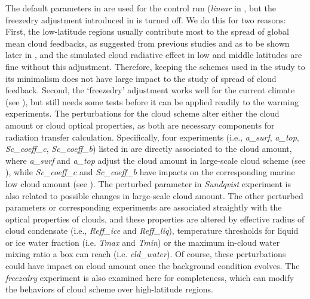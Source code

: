 The default parameters in  are used for the control run (\textit{linear} in , but the freezedry adjustment introduced in  is turned off. We do this for two reasons: First, the low-latitude regions usually contribute most to the spread of global mean cloud feedbacks, as suggested from previous studies and as to be shown later in , and the simulated cloud radiative effect in low and middle latitudes are fine without this adjustment. Therefore, keeping the schemes used in the study to its minimalism does not have large impact to the study of spread of cloud feedback. Second, the `freezedry' adjustment works well for the current climate (see ), but still needs some tests before it can be applied readily to the warming experiments. The perturbations for the cloud scheme alter either the cloud amount or cloud optical properties, as both are necessary components for radiation transfer calculation. Specifically, four experiments (i.e., \textit{a\_surf}, \textit{a\_top}, \textit{Sc\_coeff\_c}, \textit{Sc\_coeff\_b}) listed in  are directly associated to the cloud amount, where \textit{a\_surf} and \textit{a\_top} adjust the cloud amount in large-scale cloud scheme (see ), while \textit{Sc\_coeff\_c} and \textit{Sc\_coeff\_b} have impacts on the corresponding marine low cloud amount (see ). The perturbed parameter in \textit{Sundqvist} experiment is also related to possible changes in large-scale cloud amount. The other perturbed parameters or corresponding experiments are associated straightly with the optical properties of clouds, and these properties are altered by effective radius of cloud condensate (i.e., \textit{Reff\_ice} and \textit{Reff\_liq}), temperature thresholds for liquid or ice water fraction (i.e. \textit{Tmax} and \textit{Tmin}) or the maximum in-cloud water mixing ratio a box can reach (i.e. \textit{cld\_water}). Of course, these perturbations could have impact on cloud amount once the background condition evolves. The \textit{freezedry} experiment is also examined here for completeness, which can modify the behaviors of cloud scheme over high-latitude regions.

